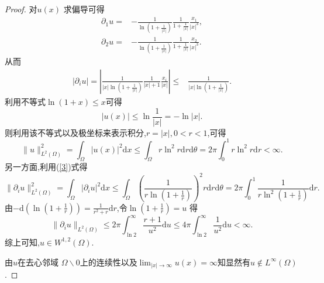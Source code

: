 \begin{proof}
  对$u(x)$ 求偏导可得
  \begin{align*}
    \partial_1u=&-\frac{1}{\ln(1+\frac{1}{|x|})}\frac{1}{1+\frac{1}{|x|}} \frac{x_1}{|x|^3},\\ 
    \partial_2u=&-\frac{1}{\ln(1+\frac{1}{|x|})}\frac{1}{1+\frac{1}{|x|}} \frac{x_2}{|x|^3}
  .\end{align*}
  从而
  \begin{align}\label{3}
    |\partial_i u|=\left| \frac{1}{|x| \ln(1+\frac{1}{|x|})} \frac{1}{|x|+1} \frac{x_i}{|x|}  \right| \le &  \frac{1}{|x|\ln(1+\frac{1}{|x|})}
  .\end{align}
   利用不等式$\ln(1+x)\le x$可得
   \[
     |u(x)|\le \ln \frac{1}{|x|}=-\ln|x|.
  \] 
  则利用该不等式以及极坐标来表示积分,$r=|x|,0<r<1$,可得
  \[
    \|u\|_{L^2(\Omega)}^2=\int_{\Omega}|u(x)|^2\mathrm{d}x\le \int_{\Omega}r\ln^2r \mathrm{d}r\mathrm{d}\theta=2\pi\int_0^{1}r\ln^2r\mathrm{d}r<\infty.
  \]
  另一方面,利用(\ref{3})式得
  \[
    \|\partial_i u\|_{L^2(\Omega)}^2=\int_{\Omega}|\partial_iu|^2\mathrm{d}x\le \int_{\Omega} \left(\frac{1}{r\ln( 1+\frac{1}{r})}\right)^2 r\mathrm{d}r\mathrm{d}\theta=2\pi\int_0^{1}\frac{1}{r \ln^2(1+\frac{1}{r})}\mathrm{d}r.
  \] 
  由$-\mathrm{d}\left( \ln(1+\frac{1}{r}) \right)=\frac{1}{r^2+r}\mathrm{d}r $,令$\ln (1+\frac{1}{r})=u$ 得
  \[
    \|\partial_iu\|_{L^2(\Omega)}\le 2\pi\int_{\ln 2}^{\infty}\frac{r+1}{u^2}\mathrm{d}u\le 4\pi \int_{\ln 2}^{\infty}\frac{1}{u^2}\mathrm{d}u<\infty.
  \] 
  综上可知,$u\in W^{1,2}(\Omega)$.

  由$u$在去心邻域 $\Omega \backslash 0$上的连续性以及$\lim_{|x|\to \infty}u(x)=\infty$知显然有$u\notin L^{\infty}(\Omega)$.
\end{proof}
